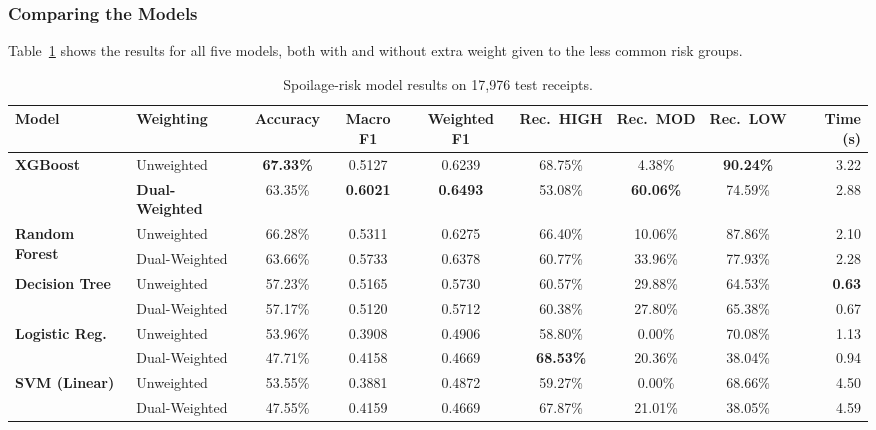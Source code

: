 \documentclass[12pt,a4paper]{article}
\renewcommand{\_}{\oldunderscore\allowbreak}
\begin{document}
\subsubsection{Comparing the Models}
Table~\ref{tab:spoilage_ablation_summary} shows the results for all five models, both with and without extra weight given to the less common risk groups.

\begin{table}[H]
\centering
\caption{Spoilage-risk model results on 17,976 test receipts.}
\label{tab:spoilage_ablation_summary}
\renewcommand{\arraystretch}{1.12}
\setlength{\tabcolsep}{3.5pt}
{\footnotesize
\begin{tabular}{@{} l l c c c c c c r @{}}
\toprule
\rowcolor{NavyPrimary}
\color{white}\textbf{Model} & \color{white}\textbf{Weighting} & \color{white}\textbf{Accuracy} & \color{white}\textbf{Macro F1} & \color{white}\textbf{Weighted F1} & \color{white}\textbf{Rec.\ HIGH} & \color{white}\textbf{Rec.\ MOD} & \color{white}\textbf{Rec.\ LOW} & \color{white}\textbf{Time (s)} \\
\midrule
\multirow{2}{*}{\textbf{XGBoost}} & Unweighted & \textbf{67.33\%} & 0.5127 & 0.6239 & 68.75\% & 4.38\% & \textbf{90.24\%} & 3.22 \\
 & \textbf{Dual-Weighted} & 63.35\% & \textbf{0.6021} & \textbf{0.6493} & 53.08\% & \textbf{60.06\%} & 74.59\% & 2.88 \\
\midrule
\multirow{2}{*}{\textbf{Random Forest}} & Unweighted & 66.28\% & 0.5311 & 0.6275 & 66.40\% & 10.06\% & 87.86\% & 2.10 \\
 & Dual-Weighted & 63.66\% & 0.5733 & 0.6378 & 60.77\% & 33.96\% & 77.93\% & 2.28 \\
\midrule
\multirow{2}{*}{\textbf{Decision Tree}} & Unweighted & 57.23\% & 0.5165 & 0.5730 & 60.57\% & 29.88\% & 64.53\% & \textbf{0.63} \\
 & Dual-Weighted & 57.17\% & 0.5120 & 0.5712 & 60.38\% & 27.80\% & 65.38\% & 0.67 \\
\midrule
\multirow{2}{*}{\textbf{Logistic Reg.}} & Unweighted & 53.96\% & 0.3908 & 0.4906 & 58.80\% & 0.00\% & 70.08\% & 1.13 \\
 & Dual-Weighted & 47.71\% & 0.4158 & 0.4669 & \textbf{68.53\%} & 20.36\% & 38.04\% & 0.94 \\
\midrule
\multirow{2}{*}{\textbf{SVM (Linear)}} & Unweighted & 53.55\% & 0.3881 & 0.4872 & 59.27\% & 0.00\% & 68.66\% & 4.50 \\
 & Dual-Weighted & 47.55\% & 0.4159 & 0.4669 & 67.87\% & 21.01\% & 38.05\% & 4.59 \\
\bottomrule
\end{tabular}}
\end{table}
\end{document}
